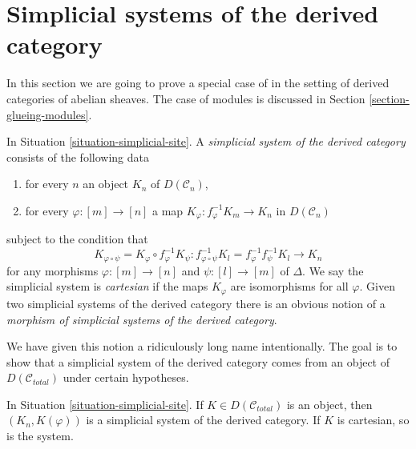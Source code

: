 










\section{Simplicial systems of the derived category}
\label{section-glueing}

\noindent
In this section we are going to prove a special case of
\cite[Proposition 3.2.9]{BBD} in the setting of derived
categories of abelian sheaves. The case of modules
is discussed in Section \ref{section-glueing-modules}.

\begin{definition}
\label{definition-cartesian-derived}
In Situation \ref{situation-simplicial-site}. A
{\it simplicial system of the derived category}
consists of the following data
\begin{enumerate}
\item for every $n$ an object $K_n$ of $D(\mathcal{C}_n)$,
\item for every $\varphi : [m] \to [n]$ a map
$K_\varphi : f_\varphi^{-1}K_m \to K_n$ in $D(\mathcal{C}_n)$
\end{enumerate}
subject to the condition that
$$
K_{\varphi \circ \psi} = K_\varphi \circ f_\varphi^{-1}K_\psi :
f_{\varphi \circ \psi}^{-1}K_l = f_\varphi^{-1} f_\psi^{-1}K_l
\longrightarrow
K_n
$$
for any morphisms $\varphi : [m] \to [n]$ and $\psi : [l] \to [m]$ of $\Delta$.
We say the simplicial system is {\it cartesian} if the maps $K_\varphi$
are isomorphisms for all $\varphi$.
Given two simplicial systems of the derived category
there is an obvious notion of a
{\it morphism of simplicial systems of the derived category}.
\end{definition}

\noindent
We have given this notion a ridiculously long name intentionally.
The goal is to show that a simplicial system of the derived category
comes from an object of $D(\mathcal{C}_{total})$ under certain
hypotheses.

\begin{lemma}
\label{lemma-cartesian-objects-derived}
In Situation \ref{situation-simplicial-site}.
If $K \in D(\mathcal{C}_{total})$ is an object,
then $(K_n, K(\varphi))$ is a simplicial system of the derived category.
If $K$ is cartesian, so is the system.
\end{lemma}

